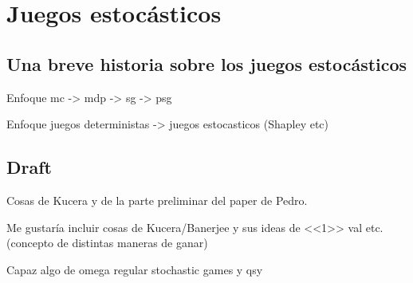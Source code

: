 





\section{Juegos estocásticos}

\subsection{Una breve historia sobre los juegos estocásticos}

Enfoque mc -> mdp -> sg -> psg

Enfoque juegos deterministas -> juegos estocasticos (Shapley etc)

\subsection{Draft}
Cosas de Kucera y de la parte preliminar del paper de Pedro.

Me gustaría incluir cosas de Kucera/Banerjee y sus ideas de <<1>> val etc.
(concepto de distintas maneras de ganar)

Capaz algo de omega regular stochastic games y qsy

